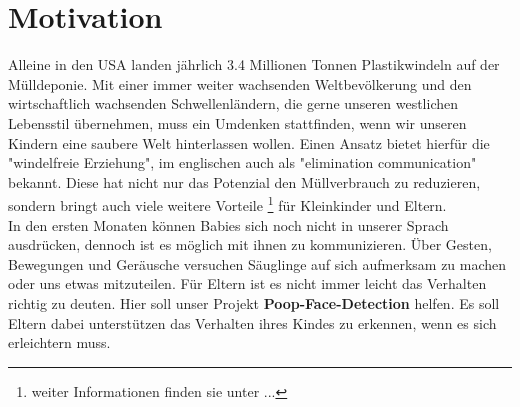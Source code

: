\section{Motivation}
\label{sec:Motivation}
Alleine in den USA landen jährlich 3.4 Millionen Tonnen Plastikwindeln auf der Mülldeponie. Mit einer immer weiter wachsenden Weltbevölkerung und den wirtschaftlich wachsenden Schwellenländern, die gerne unseren westlichen Lebensstil übernehmen,
muss ein Umdenken stattfinden, wenn wir unseren Kindern eine saubere Welt hinterlassen wollen. Einen Ansatz bietet hierfür die "windelfreie Erziehung", im englischen auch als "elimination communication" bekannt. Diese hat nicht nur das Potenzial den Müllverbrauch zu reduzieren, sondern bringt auch viele weitere Vorteile \footnote{ weiter Informationen finden sie unter ... } für Kleinkinder und Eltern. \\

In den ersten Monaten können Babies sich noch nicht in unserer Sprach ausdrücken, dennoch ist es möglich mit ihnen zu kommunizieren. Über Gesten, Bewegungen und Geräusche versuchen Säuglinge auf sich aufmerksam zu machen oder uns etwas mitzuteilen. Für Eltern ist es nicht immer leicht das Verhalten richtig zu deuten. Hier soll unser Projekt \textbf{Poop-Face-Detection} helfen. Es soll Eltern dabei unterstützen das Verhalten ihres Kindes zu erkennen, wenn es sich erleichtern muss.
